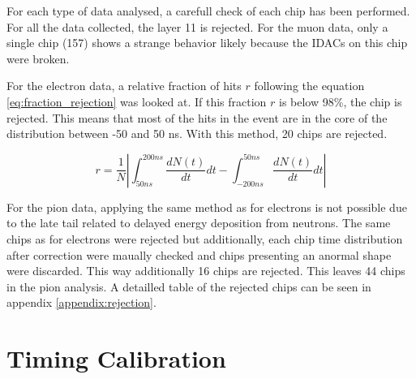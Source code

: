 For each type of data analysed, a carefull check of each chip has been performed. For all the data collected, the layer 11 is rejected. For the muon data, only a single chip (157) shows a strange behavior likely because the IDACs on this chip were broken.

For the electron data, a relative fraction of hits $r$ following the equation \ref{eq:fraction_rejection} was looked at. If this fraction $r$ is below 98\%, the chip is rejected. This means that most of the hits in the event are in the core of the distribution between -50 and 50 ns. With this method, 20 chips are rejected.

\begin{equation} \label{eq:fraction_rejection}
	r = \frac{1}{N} \left|\int_{50 ns}^{200 ns} \frac{dN(t)}{dt} dt - \int_{-200 ns}^{50 ns} \frac{dN(t)}{dt} dt\right|
\end{equation}

For the pion data, applying the same method as for electrons is not possible due to the late tail related to delayed energy deposition from neutrons. The same chips as for electrons were rejected but additionally, each chip time distribution after correction were maually checked and chips presenting an anormal shape were discarded. This way additionally 16 chips are rejected. This leaves 44 chips in the pion analysis. A detailled table of the rejected chips can be seen in appendix \ref{appendix:rejection}.

\section{Timing Calibration}

\begin{table}[htb!]
	\centering
	\caption{Table with the run statistic before and after selection used for timing calibration.}
	\label{table:mu_elec_runs}
\end{table}

